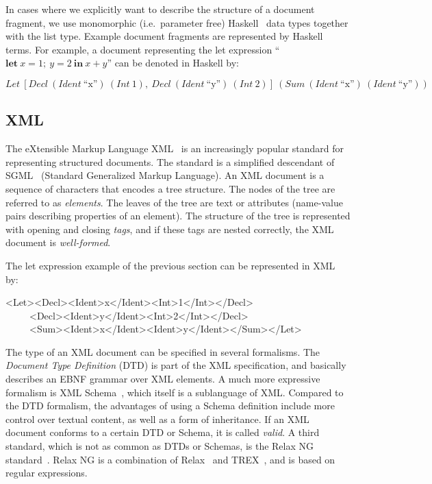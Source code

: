 \documentclass{speauth}
\begin{document}
In cases where we explicitly want to describe the structure of a document fragment, we use monomorphic (i.e.\ parameter free) Haskell~\cite{peytonJones03haskell} data types together with the list type. Example document fragments are represented by Haskell terms. For example, a document representing the let expression  ``$\mathbf{let}~x = 1;~y = 2~\mathbf{in}~x+y$'' can be denoted in Haskell by: 

\begin{small}

$Let~[Decl~(Ident~\text{``x''})~(Int~1),~Decl~(Ident~\text{``y''})~(Int~2)]~(Sum~(Ident~\text{``x''})~(Ident~\text{``y''}))$

\end{small}

\subsection{XML}
The eXtensible Markup Language XML~\cite{xml11} is an increasingly popular standard for representing structured documents. The standard is a simplified descendant of SGML~\cite{sgml86} (Standard Generalized Markup Language). An XML document is a sequence of characters that encodes a tree structure. The nodes of the tree are referred to as {\em elements}. The leaves of the tree are text or attributes (name-value pairs describing properties of an element). The structure of the tree  is represented with opening and closing {\em tags}, and if these tags are nested correctly, the XML document is {\em well-formed}.

The let expression example of the previous section can be represented in XML by:

\ttfamily\begin{small}\begin{tabbing}

<Let><Decl><Ident>x</Ident><Int>1</Int></Decl>\\

~~~~~<Decl><Ident>y</Ident><Int>2</Int></Decl>\\

~~~~~<Sum><Ident>x</Ident><Ident>y</Ident></Sum></Let>

\end{tabbing}\end{small}\rmfamily

The type of an XML document can be specified in several formalisms. The {\em Document Type Definition} (DTD) is part of the XML specification, and basically describes an EBNF grammar over XML elements. A much more expressive formalism is XML Schema~\cite{xmlSchema1}, which itself is a sublanguage of XML. Compared to the DTD formalism, the advantages of using a Schema definition include more control over textual content, as well as a form of inheritance. If an XML document conforms to a certain DTD or Schema, it is called {\em valid}. A third standard, which is not as common as DTDs or Schemas, is the Relax NG standard~\cite{relaxNG01}. Relax NG is a combination of Relax~\cite{relax01} and TREX~\cite{trex01}, and is based on regular expressions. 
\end{document}
